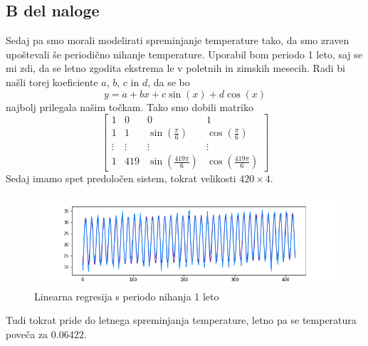 \documentclass{article}
\begin{document}
    \subsection{B del naloge}
    Sedaj pa smo morali modelirati spreminjanje temperature tako, da smo zraven upoštevali še periodično nihanje temperature. Uporabil bom periodo 1 leto, saj se mi zdi, da se
    letno zgodita ekstrema le v poletnih in zimskih mesecih. Radi bi našli torej koeficiente $a$, $b$, $c$ in $d$, da se bo
    \[
        y = a + bx +c\sin(x)+d\cos(x)
    \]
    najbolj prilegala našim točkam. Tako smo dobili matriko
    \[
        \begin{bmatrix}
            1 & 0 & 0 & 1 \\
            1 & 1 & \sin(\frac{\pi}{6}) & \cos(\frac{\pi}{6}) \\
            \vdots & \vdots & \vdots & \vdots \\
            1 & 419 & \sin(\frac{419\pi}{6}) & \cos(\frac{419\pi}{6})
        \end{bmatrix}  
    \]
    Sedaj imamo spet predoločen sistem, tokrat velikosti $420\times4$.
    \begin{figure}[H]
        \begin{center}
            \includegraphics[scale=0.5]{../PythonKoda/NihLinReg.png}
            \caption{Linearna regresija s periodo nihanja 1 leto}
            \label{NLR}
        \end{center} 
    \end{figure}
    Tudi tokrat pride do letnega spreminjanja temperature, letno pa se temperatura poveča za $0.06422$.
\end{document}
